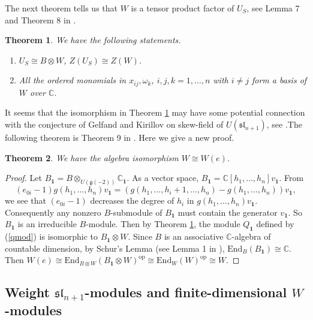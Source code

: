 \documentclass[12pt,a4paper]{amsart}
\newtheorem{theorem}{Theorem}[section]
\numberwithin{equation}{section}
\newcommand{\C}{\mathbb C}
\def\mg{\mathfrak{g}}
\def\sl{\mathfrak{sl}}
\def\b1{\mathbf{1}}
\begin{document}
 The next theorem tells us that $W$ is a tensor product factor of
$U_{S}$, see Lemma 7 and Theorem 8 in \cite{LL}.


 \begin{theorem}\label{main-iso-th}
 We have the following statements.
  \begin{enumerate}[$($a$)$]
 \item $U_{S}\cong B \otimes W $, $Z(U_{S})\cong Z(W)$.
 \item All the ordered monomials in $x_{ij}, \omega_k $, $i, j,k=1,\dots, n $ with
  $i\neq j$ form a basis of $W$
over $\C$.
   \end{enumerate}
\end{theorem}


It seems that the isomorphism in  Theorem  \ref{main-iso-th} may
have some potential connection with the conjecture  of Gelfand and Kirillov on skew-field of $U(\sl_{n+1})$, see \cite{GK}.The following theorem is Theorem 9 in \cite{LL}. Here we give a new proof.

\begin{theorem}\label{iso-thw} We have the algebra isomorphism $W\cong W(e)$.
\end{theorem}
\begin{proof}Let $B_{\b1}=B \otimes_{U(\mg(-2) )}\C_{\b1}$. As a vector space, $B_{\b1}=\C[h_1,\dots,h_n]v_{\b1}$. From
$$(e_{0i}-1)g(h_1,\dots, h_n)v_{\b1}=(g(h_1,\dots, h_i+1,\dots, h_n)-g(h_1,\dots, h_n))v_{\b1},$$ we see that $(e_{0i}-1)$ decreases the degree of $h_i$ in $g(h_1,\dots, h_n)v_{\b1}$. Consequently  any nonzero $B$-submodule of $B_{\b1}$ must contain the generator $v_{\b1}$. So $B_{\b1}$ is an irreducible $B$-module.
Then by Theorem \ref{main-iso-th}, the module $Q_{\b1}$ defined by (\ref{qmod}) is isomorphic to $B_{\b1}\otimes W$.
Since $B$ is an associative $\C$-algebra of countable dimension,
by Schur's Lemma (see Lemma 1 in \cite{PS}), $\text{End}_{ B}(B_{\b1} )\cong \C$.
Then
$W(e)\cong \text{End}_{ B \otimes W}(B_{\b1}\otimes W )^{\text{op}}\cong \text{End}_{W}(W )^{\text{op}}\cong W$.
\end{proof}

\subsection{Weight  $\sl_{n+1}$-modules and
finite-dimensional $W$-modules}
\end{document}
